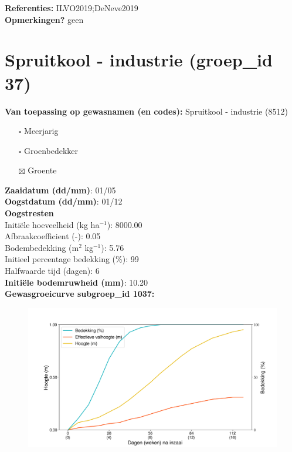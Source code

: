 \documentclass{article}
\begin{document}
  \textbf{Referenties:} ILVO2019;DeNeve2019 \vspace{0.10cm} \\ 
  \textbf{Opmerkingen?} geen \vspace{0.10cm} \\ 
 \newpage 
 \section{Spruitkool - industrie (groep\_id 37)} 
 \textbf{Van toepassing op gewasnamen (en codes):} Spruitkool - industrie (8512) 
 \begin{multicols}{3} \begin{itemize} \item[$\square$] Meerjarig \item[$\square$] Groenbedekker \item[$\boxtimes$] Groente \end{itemize} \end{multicols} 
  \textbf{Zaaidatum (dd/mm)}: 01/05  \vspace{0.10cm} \\ 
  \textbf{Oogstdatum (dd/mm)}: 01/12  \vspace{0.10cm} \\ 
  \textbf{Oogstresten} \vspace{0.05cm} \\ 
  \tab Initi\"{e}le hoeveelheid (kg ha$^{-1}$): 8000.00 \vspace{0.05cm} \\ 
  \tab Afbraakcoefficient (-): 0.05 \vspace{0.05cm} \\ 
  \tab Bodembedekking (m$^2$ kg$^{-1}$): 5.76 \vspace{0.05cm} \\ 
  \tab Initieel percentage bedekking (\%): 99 \vspace{0.05cm} \\ 
  \tab Halfwaarde tijd (dagen): 6 \vspace{0.05cm} \\ 
  \textbf{Initi\"{e}le bodemruwheid (mm)}: 10.20 \vspace{0.05cm} \\ 
  \textbf{Gewasgroeicurve subgroep\_id 1037:} 
 \begin{center} \begin{figure}[H] \includegraphics[width=12.5cm]{temp/1037.png} \end{figure} \end{center} 
\end{document}
